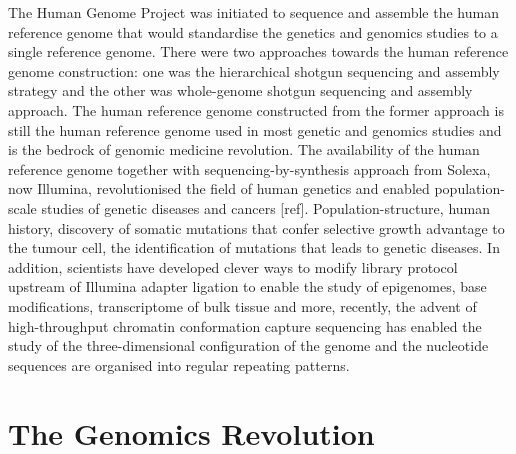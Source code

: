 The Human Genome Project was initiated to sequence and assemble the human reference genome that would standardise the genetics and genomics studies to a single reference genome. There were two approaches towards the human reference genome construction: one was the hierarchical shotgun sequencing and assembly strategy and the other was whole-genome shotgun sequencing and assembly approach. The human reference genome constructed from the former approach is still the human reference genome used in most genetic and genomics studies and is the bedrock of genomic medicine revolution\cite{}. The availability of the human reference genome together with sequencing-by-synthesis approach from Solexa, now Illumina, revolutionised the field of human genetics and enabled population-scale studies of genetic diseases and cancers [ref]. Population-structure, human history, discovery of somatic mutations that confer selective growth advantage to the tumour cell, the identification of mutations that leads to genetic diseases. In addition, scientists have developed clever ways to modify library protocol upstream of Illumina adapter ligation to enable the study of epigenomes, base modifications, transcriptome of bulk tissue and more, recently, the advent of high-throughput chromatin conformation capture sequencing has enabled the study of the three-dimensional configuration of the genome and the nucleotide sequences are organised into regular repeating patterns. 


\section{The Genomics Revolution}


